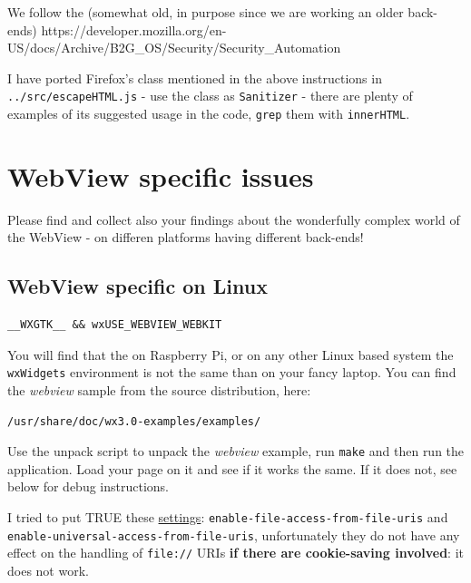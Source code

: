 \documentclass[11pt]{article}
\begin{document}
    We follow the (somewhat old, in purpose since we are working an older
back-ends)
https://developer.mozilla.org/en-US/docs/Archive/B2G\_OS/Security/Security\_Automation

    I have ported Firefox's class mentioned in the above instructions in
\texttt{../src/escapeHTML.js} - use the class as \texttt{Sanitizer} -
there are plenty of examples of its suggested usage in the code,
\texttt{grep} them with \texttt{innerHTML}.

    \hypertarget{webview-specific-issues}{%
\section{WebView specific issues}\label{webview-specific-issues}}

    Please find and collect also your findings about the wonderfully complex
world of the WebView - on differen platforms having different back-ends!

    \hypertarget{webview-specific-on-linux}{%
\subsection{WebView specific on Linux}\label{webview-specific-on-linux}}

    \begin{verbatim}
__WXGTK__ && wxUSE_WEBVIEW_WEBKIT
\end{verbatim}

    You will find that the on Raspberry Pi, or on any other Linux based
system the \texttt{wxWidgets} environment is not the same than on your
fancy laptop. You can find the \emph{webview} sample from the source
distribution, here:

\begin{verbatim}
/usr/share/doc/wx3.0-examples/examples/
\end{verbatim}

Use the unpack script to unpack the \emph{webview} example, run
\texttt{make} and then run the application. Load your page on it and see
if it works the same. If it does not, see below for debug instructions.

    I tried to put TRUE these
\href{https://webkitgtk.org/reference/webkitgtk/2.4.10/webkitgtk-webkitwebview.html}{settings}:
\texttt{enable-file-access-from-file-uris} and
\texttt{enable-universal-access-from-file-uris}, unfortunately they do
not have any effect on the handling of \texttt{file://} URIs \textbf{if
there are cookie-saving involved}: it does not work.
\end{document}
